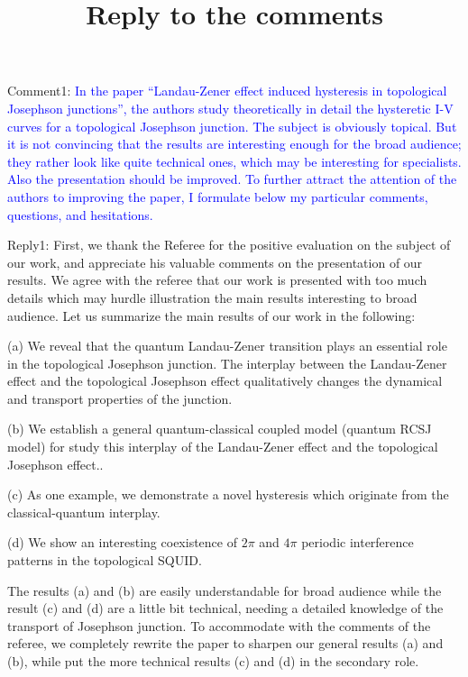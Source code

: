 \documentclass[onecolumn,preprintnumbers,amsmath,amssymb,prb]{revtex4}
\newcommand{\blue}[1]{\textcolor{blue}{#1}}
\begin{document}



\title{Reply to the comments}


\maketitle




\noindent Comment1: 
\blue{In the paper “Landau-Zener effect induced hysteresis in topological
Josephson junctions”, the authors study theoretically in detail the
hysteretic I-V curves for a topological Josephson junction. The
subject is obviously topical. But it is not convincing that the
results are interesting enough for the broad audience; they rather
look like quite technical ones, which may be interesting for
specialists. Also the presentation should be improved. To further
attract the attention of the authors to improving the paper, I
formulate below my particular comments, questions, and hesitations.}

\vspace{5mm}

\noindent Reply1: 
First, we thank the Referee for the positive evaluation on the subject of our work, and appreciate his valuable comments on the presentation of our results. We agree with the referee that our work is presented with too much details which may hurdle illustration the main results interesting to broad audience. Let us summarize the main results of our work in the following:

(a) We reveal that the quantum Landau-Zener transition plays an essential role in the topological Josephson junction. The interplay between the Landau-Zener effect and the topological Josephson effect qualitatively changes the dynamical and transport properties of the junction. 

(b) We establish a general quantum-classical coupled model (quantum RCSJ model) for study this interplay  of the Landau-Zener effect and the topological Josephson effect..

(c) As one example, we demonstrate a novel hysteresis which originate from the classical-quantum interplay.

(d) We show an interesting coexistence of $2\pi$ and $4\pi$ periodic 
interference patterns in the topological SQUID.


The results (a) and (b) are easily understandable for broad audience while the result (c) and (d) are a little bit technical, needing a detailed knowledge of the transport of Josephson junction. To accommodate with the comments of the referee, we completely rewrite the paper to sharpen our general results (a) and (b), while put the more technical results (c) and (d) in the secondary role.
\end{document}
